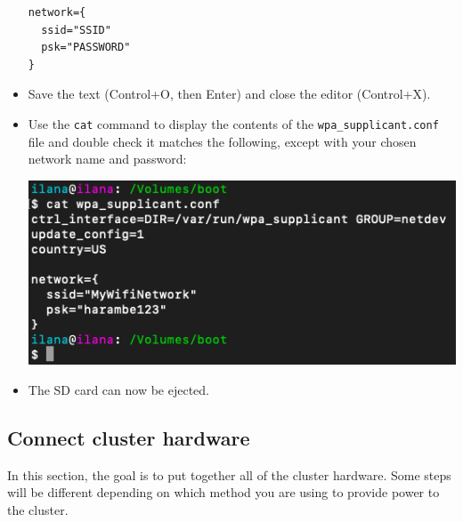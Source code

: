 \documentclass{article}
\begin{document}
\begin{itemize}
\begin{verbatim}
network={
  ssid="SSID"
  psk="PASSWORD"
}
\end{verbatim}

\item Save the text (Control+O, then Enter) and close the editor (Control+X).

\item Use the \texttt{cat} command to display the contents of the \texttt{wpa\_supplicant.conf} file and double check it matches the following, except with your chosen network name and password:

\includegraphics[width=\textwidth]{images/cat-wpa-supplicant.png}

\item The SD card can now be ejected.
\end{itemize}

\subsection{Connect cluster hardware}

In this section, the goal is to put together all of the cluster hardware. Some steps will be different depending on which method you are using to provide power to the cluster.
\end{document}
